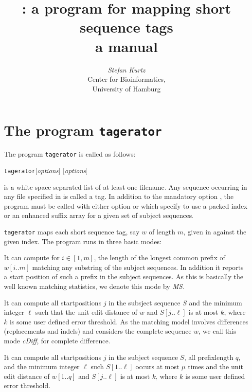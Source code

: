 \documentclass[12pt]{article}
\title{\Program: a program for mapping short sequence tags\\
       a manual}
\author{\begin{tabular}{c}
         \textit{Stefan Kurtz}\\
         Center for Bioinformatics,\\
         University of Hamburg
        \end{tabular}}
\newcommand{\Substring}[3]{#1[#2..#3]}
\newcommand{\Program}[0]{\texttt{tagerator}\xspace}
\begin{document}
\maketitle

\section{The program \Program}

The program \Program is called as follows:
\par
\noindent\Program [\textit{options}]   [\textit{options}] 
\par
{} is a white space separated list of at least one 
filename. Any sequence occurring in any file specified in 
 is called a tag.
In addition to the mandatory option , the program
must be called with either option  or 
which specify to use a packed index or an enhanced suffix array for 
a given set of subject sequences.

\Program maps each short sequence tag, say \(w\) of length \(m\), given in
 against the given index.
The program runs in three basic modes:
\begin{description}
\item[ms]
It can compute for \(i\in[1,m]\), the length of the longest common prefix 
of \(\Substring{w}{i}{m}\) matching any substring of the subject sequences.
In addition it reports a start position of such a prefix in the
subject sequences. As this is basically the well known matching statistics,
we denote this mode by \textit{MS}.
\item[cdiff]
It can compute all startpositions \(j\) in the subsject sequence \(S\) and the
minimum integer \(\ell\) such
that the unit edit distance of \(w\) and \(\Substring{S}{j}{\ell}\) is 
at most \(k\), where \(k\) is some user defined error threshold. As the 
matching model involves differences (replacements and indels) and 
considers the complete sequence \(w\), we call this mode \textit{cDiff},
for complete difference.
\item
It can compute all startpositions \(j\) in the subject sequence \(S\),
all prefixlength \(q\), and the minimum integer \(\ell\) such
\(\Substring{S}{1}{\ell}\) occurs at most \(\mu\) times and
the unit edit distance of \(\Substring{w}{1}{q}\) and 
\(\Substring{S}{j}{\ell}\) is at most \(k\), where \(k\) is some user 
defined error threshold.
\end{description}
\end{document}
